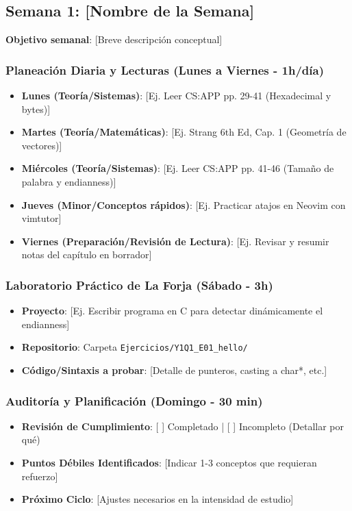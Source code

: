 \documentclass[11pt, a4paper]{article}
\begin{document}
\subsection{Semana 1: [Nombre de la Semana]}
\textbf{Objetivo semanal}: [Breve descripción conceptual]

\subsubsection{Planeación Diaria y Lecturas (Lunes a Viernes - 1h/día)}
\begin{itemize}
    \item \textbf{Lunes (Teoría/Sistemas)}: [Ej. Leer CS:APP pp. 29-41 (Hexadecimal y bytes)]
    \item \textbf{Martes (Teoría/Matemáticas)}: [Ej. Strang 6th Ed, Cap. 1 (Geometría de vectores)]
    \item \textbf{Miércoles (Teoría/Sistemas)}: [Ej. Leer CS:APP pp. 41-46 (Tamaño de palabra y endianness)]
    \item \textbf{Jueves (Minor/Conceptos rápidos)}: [Ej. Practicar atajos en Neovim con vimtutor]
    \item \textbf{Viernes (Preparación/Revisión de Lectura)}: [Ej. Revisar y resumir notas del capítulo en borrador]
\end{itemize}

\subsubsection{Laboratorio Práctico de La Forja (Sábado - 3h)}
\begin{itemize}
    \item \textbf{Proyecto}: [Ej. Escribir programa en C para detectar dinámicamente el endianness]
    \item \textbf{Repositorio}: Carpeta \texttt{Ejercicios/Y1Q1\_E01\_hello/}
    \item \textbf{Código/Sintaxis a probar}: [Detalle de punteros, casting a char*, etc.]
\end{itemize}

\subsubsection{Auditoría y Planificación (Domingo - 30 min)}
\begin{itemize}
    \item \textbf{Revisión de Cumplimiento}: [ ] Completado | [ ] Incompleto (Detallar por qué)
    \item \textbf{Puntos Débiles Identificados}: [Indicar 1-3 conceptos que requieran refuerzo]
    \item \textbf{Próximo Ciclo}: [Ajustes necesarios en la intensidad de estudio]
\end{itemize}
\end{document}
